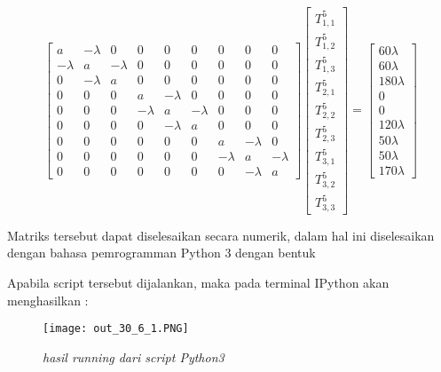 \documentclass[a4paper,12pt]{article}
\numberwithin{equation}{section} %
\begin{document}
\begin{equation}
\begin{bmatrix}
a & -\lambda & 0 & 0 & 0 & 0 & 0 & 0 & 0\\ 
-\lambda & a & -\lambda & 0 & 0 & 0 & 0 & 0 & 0\\ 
0 & -\lambda & a & 0 & 0 & 0 & 0 & 0 & 0\\ 
0 & 0 & 0 & a & -\lambda & 0 & 0 & 0 & 0\\ 
0 & 0 & 0 & -\lambda & a & -\lambda & 0 & 0 & 0\\ 
0 & 0 & 0 & 0 & -\lambda & a & 0 & 0 & 0\\ 
0 & 0 & 0 & 0 & 0 & 0 & a & -\lambda & 0\\ 
0 & 0 & 0 & 0 & 0 & 0 & -\lambda & a & -\lambda\\ 
0 & 0 & 0 & 0 & 0 & 0 & 0 & -\lambda & a
\end{bmatrix}
\begin{bmatrix}
T_{1,1}^5\\ 
T_{1,2}^5\\ 
T_{1,3}^5\\ 
T_{2,1}^5\\ 
T_{2,2}^5\\ 
T_{2,3}^5\\ 
T_{3,1}^5\\ 
T_{3,2}^5\\ 
T_{3,3}^5
\end{bmatrix} = 
\begin{bmatrix}
60\lambda\\ 
60\lambda\\ 
180\lambda\\ 
0\\ 
0\\ 
120\lambda\\ 
50\lambda\\ 
50\lambda\\ 
170\lambda
\end{bmatrix}
\end{equation}

Matriks tersebut dapat diselesaikan secara numerik, dalam hal ini diselesaikan dengan bahasa pemrogramman Python 3 dengan bentuk


Apabila script tersebut dijalankan, maka pada terminal IPython akan menghasilkan :
\begin{figure}[h]
	\centering
	\caption{\textit{hasil running dari script Python3}}
	\texttt{[image: out\_30\_6\_1.PNG]}
\end{figure}
\end{document}
